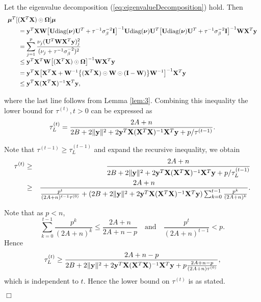\documentclass[11pt]{article}
\newtheorem{Main Result}{Main Result}
\def\vectorfontone{\bf}
\def\vectorfonttwo{\boldsymbol}
\def\vy{{\vectorfontone y}}                      %
\def\vmu{{\vectorfonttwo \mu}}                   %
\def\vnu{{\vectorfonttwo \nu}}                   %
\def\matrixfontone{\bf}
\def\matrixfonttwo{\boldsymbol}
\def\mI{{\matrixfontone I}}                      %
\def\mU{{\matrixfontone U}}                      %
\def\mW{{\matrixfontone W}}                      %
\def\mX{{\matrixfontone X}}                      %
\def\mOmega{{\matrixfonttwo \Omega}}             %
\def\ds{\displaystyle}
\def\diag{\text{diag}}
\begin{document}
{	\noindent Let the eigenvalue decomposition (\ref{eq:eigenvalueDecomposition}) hold. Then
	$$
	\begin{array}{l}
	\vmu^T[(\mX^T\mX)\odot\mOmega]\vmu\\ [1ex]
	\ds \qquad =
	\vy^T\mX\mW\big[\mU\diag(\vnu)\mU^T + \tau^{-1}\sigma_\beta^{-2}\mI\big]^{-1}
	\mU\diag(\vnu)\mU^T
	\big[\mU\diag(\vnu)\mU^T + \tau^{-1}\sigma_\beta^{-2}\mI\big]^{-1}\mW\mX^T\vy\\[1ex]
	\ds \qquad = \sum_{j=1}^p
	\frac{\nu_j(\mU^{T}\mW\mX^T\vy)_j^2}{
		(\nu_j + \tau^{-1}\sigma_\beta^{-2})^2}
	\\
	\ds \qquad \le \vy^T\mX^T\mW\big[(\mX^T\mX)\odot\mOmega\big]^{-1}\mW\mX^T\vy
	\\ [1ex]
	\ds \qquad = \vy^T\mX
	\big[\mX^T\mX + \mW^{-1}\big\{(\mX^T\mX)\odot\mW\odot(\mI - \mW)\big\}\mW^{-1}\big]^{-1}\mX^T\vy
	\\ [1ex]
	\ds \qquad \le \vy^T\mX(\mX^T\mX)^{-1}\mX^T\vy,
	\end{array}
	$$
	
	\noindent where the last line follows from Lemma \ref{lem:3}. Combining this inequality the lower bound for $\tau^{(t)}, t>0$ can be expressed as
	\begin{equation}\label{eq:lowerTau^t}
	\tau^{(t)}_L=\frac{2A + n }{2B + 2\|\vy\|^2 + 2\vy^T\mX(\mX^T\mX)^{-1}\mX^T\vy + p/\tau^{(t-1)}}.
	\end{equation}
	
	\noindent Note that $\tau^{(t-1)}\ge \tau^{(t-1)}_L$ and expand the recursive inequality, we obtain
	\begin{eqnarray*}
		\tau^{(t)}&\ge&\frac{2A + n }{2B + 2\|\vy\|^2 + 2\vy^T\mX(\mX^T\mX)^{-1}\mX^T\vy + p/\tau^{(t-1)}_L}\\
		&\ge&\frac{2A + n }{ \frac{p^t}{(2A + n)^{t-1}\tau^{(0)}}
			+ (2B + 2\|\vy\|^2 + 2\vy^T\mX(\mX^T\mX)^{-1}\mX^T\vy)
			\sum_{k=0}^{t-1}\frac{p^k}{(2A + n)^k }}.
	\end{eqnarray*}
	
	\noindent Note that as $p < n$,
	$$\sum_{k=0}^{t-1}\frac{p^k}{(2A + n)^k} \le \frac{2A + n}{2A + n - p}
	\quad \mbox{and} \quad
	\frac{p^t}{(2A + n)^{t-1}} < p.
	$$
	Hence
	$$\tau^{(t)}_L \ge \frac{2A + n -p }{
		2B + 2\|\vy\|^2 + 2\vy^T\mX(\mX^T\mX)^{-1}\mX^T\vy + p\frac{2A + n -p}{(2A + n)\tau^{(0)}}},
	$$
	which is independent to $t$. Hence the lower bound on $\tau^{(t)}$ is as stated.
	\vspace{-0.5cm}\begin{flushright}$\Box$\end{flushright}
}
\end{document}
